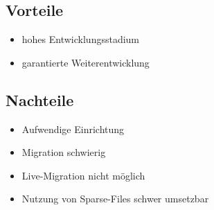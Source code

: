\subsection{Vorteile}
\begin{itemize}
 \item hohes Entwicklungsstadium
 \item garantierte Weiterentwicklung
\end{itemize}

\subsection{Nachteile}
\begin{itemize}
 \item Aufwendige Einrichtung
 \item Migration schwierig
 \item Live-Migration nicht möglich
 \item Nutzung von Sparse-Files schwer umsetzbar
\end{itemize}
